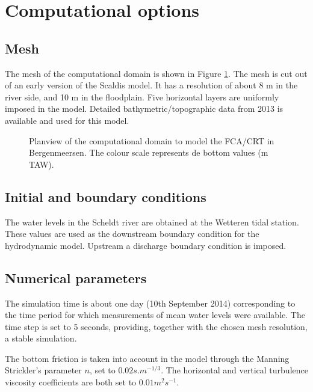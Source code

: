 \section{Computational options}
%
\subsection{Mesh}
The mesh of the computational domain is shown in Figure \ref{fig:bergenmeersen_figure4}.
The mesh is cut out of an early version of the Scaldis model.
It has a resolution of about 8 m in the river side, and 10 m in the floodplain.
Five horizontal layers are uniformly imposed in the model.
Detailed bathymetric/topographic data from 2013 is available and used for this model.
\begin{figure}[H]
\begin{center}
\end{center}
\caption{Planview of the computational domain to model the FCA/CRT in Bergenmeersen.
The colour scale represents de bottom values (m TAW).}
\label{fig:bergenmeersen_figure4}
\end{figure}
%
\subsection{Initial and boundary conditions}
The water levels in the Scheldt river are obtained at the Wetteren tidal station.
These values are used as the downstream boundary condition for the hydrodynamic model.
Upstream a discharge boundary condition is imposed.
%
\subsection{Numerical parameters}
The simulation time is about one day (10th September 2014) corresponding to the time period
for which measurements of mean water levels were available.
The time step is set to 5 seconds, providing, together with the chosen mesh resolution, a stable simulation.

The bottom friction is taken into account in the model through the Manning Strickler’s parameter $n$, set to $0.02 s.m^{-1/3}$.
The horizontal and vertical turbulence viscosity coefficients are both set to $0.01 m^2s^{-1}$.

